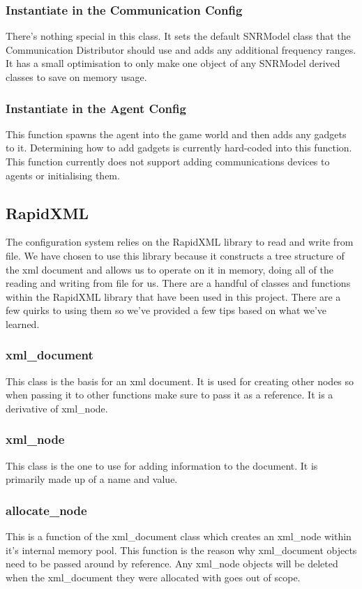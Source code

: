 \documentclass[../main.tex]{subfiles}
\begin{document}
\subsubsection{Instantiate in the Communication Config}
There's nothing special in this class.
It sets the default SNRModel class that the Communication Distributor should use and adds any additional frequency ranges.
It has a small optimisation to only make one object of any SNRModel derived classes to save on memory usage.

\subsubsection{Instantiate in the Agent Config}
This function spawns the agent into the game world and then adds any gadgets to it.
Determining how to add gadgets is currently hard-coded into this function.
This function currently does not support adding communications devices to agents or initialising them.

\subsection{RapidXML}
The configuration system relies on the RapidXML library to read and write from file.
We have chosen to use this library because it constructs a tree structure of the xml document and allows us to operate on it in memory, doing all of the reading and writing from file for us.
There are a handful of classes and functions within the RapidXML library that have been used in this project.
There are a few quirks to using them so we've provided a few tips based on what we've learned.

\subsubsection{xml\_document}
This class is the basis for an xml document.
It is used for creating other nodes so when passing it to other functions make sure to pass it as a reference.
It is a derivative of xml\_node.

\subsubsection{xml\_node}
This class is the one to use for adding information to the document.
It is primarily made up of a name and value.

\subsubsection{allocate\_node}
This is a function of the xml\_document class which creates an xml\_node within it's internal memory pool.
This function is the reason why xml\_document objects need to be passed around by reference.
Any xml\_node objects will be deleted when the xml\_document they were allocated with goes out of scope.
\end{document}
